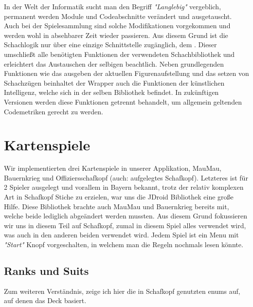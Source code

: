 In der Welt der Informatik sucht man den Begriff \emph{"Langlebig"} vergeblich,
permanent werden Module und Codeabschnitte verändert und ausgetauscht. Auch bei
der Spielesammlung sind solche Modifikationen vorgekommen und werden wohl in
absehbarer Zeit wieder passieren. Aus diesem Grund ist die Schachlogik nur über
eine einzige Schnittstelle zugänglich, dem . Dieser
umschließt alle benötigten Funktionen der verwendeten Schachbibliothek und
erleichtert das Austauschen der selbigen beachtlich. Neben grundlegenden
Funktionen wie das ausgeben der aktuellen Figurenaufstellung und das setzen von
Schachzügen beinhaltet der Wrapper auch die Funktionen der künstlichen
Intelligenz, welche sich in der selben Bibliothek befindet. In zukünftigen
Versionen werden diese Funktionen getrennt behandelt, um allgemein geltenden
Codemetriken gerecht zu werden. 

\section{Kartenspiele}
\sectionauthor{\philipp}
Wir implementierten drei Kartenspiele in unserer Applikation, MauMau, Bauernkrieg und Offiziersschafkopf (auch: aufgelegtes Schafkopf). Letzteres ist für 2 Spieler ausgelegt und vorallem in Bayern bekannt, trotz der relativ komplexen Art in Schafkopf Stiche zu erzielen, war uns die JDroid Bibliothek eine große Hilfe. Diese Bibliothek brachte auch MauMau und Bauernkrieg bereits mit, welche beide lediglich abgeändert werden mussten.
Aus diesem Grund fokussieren wir uns in diesem Teil auf Schafkopf, zumal in diesem Spiel alles verwendet wird, was auch in den anderen beiden verwendet wird.
Jedem Spiel ist ein Menu mit \emph{"Start"} Knopf vorgeschalten, in welchem man die Regeln nochmals lesen könnte.

\subsection{Ranks und Suits}
Zum weiteren Verständnis, zeige ich hier die in Schafkopf genutzten enums auf, auf denen das Deck basiert.


